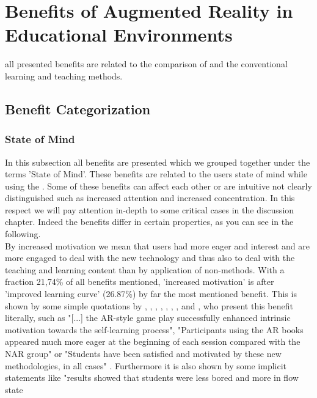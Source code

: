 \section{Benefits of Augmented Reality in Educational Environments}
all presented benefits are related to the comparison of \AR \apps and the conventional learning and teaching methods.
\subsection{Benefit Categorization}
\label{subsec:Benefits}

% 
\subsubsection{State of Mind}
In this subsection all benefits are presented which we grouped together under the terms 'State of Mind'. These benefits are related to the users state of mind while using the \AR \app. Some of these benefits can affect 
each other or are intuitive not clearly distinguished such as increased attention and increased concentration. In this respect we will pay attention in-depth to some critical cases in the discussion chapter. Indeed the benefits 
differ in certain properties, as you can see in the following. \\
By increased motivation we mean that users had more eager and interest and are more engaged to deal with the new technology and thus also to deal with the teaching and learning content than by application of non-\AR methods. With a fraction 21,74\% of all benefits mentioned, 
'increased motivation' is after 'improved learning curve' (26.87\%) by far the most mentioned benefit. This is shown by some simple quotations by \cite{Dunser.2012}, \cite{Iwata.2011}, 
\cite{Kamarainen.2013}, \cite{Liu.2009b}, \cite{MartinGutierrez.2011}, \cite{MartinGutierrez.2011}, \cite{Redondo.2013}, \cite{VateULan.2012} and \cite{Yen.2013}, who present this benefit literally, such as "[...] the AR-style game play successfully enhanced intrinsic motivation towards the self-learning process"\autocite[113]{Iwata.2011}, "Participants 
using the AR books appeared much more eager at the beginning of each session compared with the NAR group"\autocite[112]{Andreas.2012} or "Students have been satisfied and motivated by these new methodologies, in all cases"
\autocite[et.al.][60]{Redondo.2013}. Furthermore it is also shown by some implicit statements like "results showed that students were less bored and more in flow state
